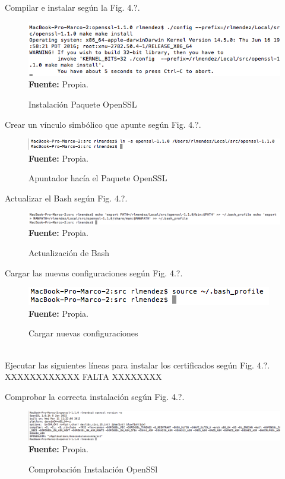 \documentclass[a4paper,openright,12pt]{book}
\theoremstyle{definition}
\theoremstyle{remark}
\begin{document}
\begin{enumerate}
Compilar e instalar según la Fig. 4.?.
\begin{figure}[h]
\centering
\caption{Instalación Paquete OpenSSL} 
\includegraphics[scale=0.6]{4_OpenSSL}
\label{fig:4_OpenSSL}
\\ \textbf{Fuente:} Propia.
\end{figure}

Crear un vínculo simbólico que apunte según Fig. 4.?.
\begin{figure}[!htbp]
\centering
\caption{Apuntador hacía el Paquete OpenSSL} 
\includegraphics[scale=0.5]{5_OpenSSL}
\label{fig:5_OpenSSL}
\\ \textbf{Fuente:} Propia.
\end{figure}

Actualizar el Bash según Fig. 4.?.
\begin{figure}[!htbp]
\centering
\caption{Actualización de Bash} 
\includegraphics[scale=0.46]{6_OpenSSL}
\label{fig:6_OpenSSL}
\\ \textbf{Fuente:} Propia.
\end{figure}

Cargar las nuevas configuraciones según Fig. 4.?.
\begin{figure}[!htbp]
\centering
\caption{Cargar nuevas configuraciones} 
\includegraphics[scale=0.5]{7_OpenSSL}
\label{fig:7_OpenSSL}
\\ \textbf{Fuente:} Propia.
\end{figure} \\

Ejecutar las siguientes líneas para instalar los certificados según Fig. 4.?.
XXXXXXXXXXXX FALTA XXXXXXXX

Comprobar la correcta instalación según Fig. 4.?.
\begin{figure}[!htbp]
\centering
\caption{Comprobación Instalación OpenSSl} 
\includegraphics[scale=0.37]{9_OpenSSL}
\label{fig:9_OpenSSL}
\\ \textbf{Fuente:} Propia.
\end{figure}



\end{enumerate}
\end{document}
